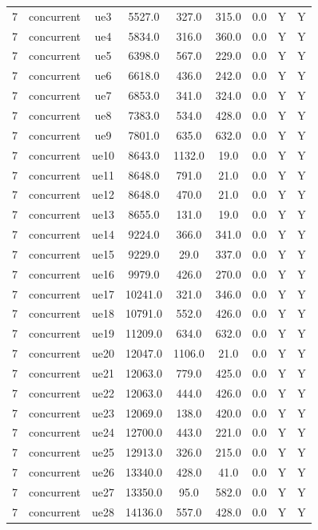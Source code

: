 \begin{table}[ht]
\begin{tabular}{|c|c|c|c|c|c|c|c|c|}
7 & concurrent & ue3 & 5527.0 & 327.0 & 315.0 & 0.0 & Y & Y \\
7 & concurrent & ue4 & 5834.0 & 316.0 & 360.0 & 0.0 & Y & Y \\
7 & concurrent & ue5 & 6398.0 & 567.0 & 229.0 & 0.0 & Y & Y \\
7 & concurrent & ue6 & 6618.0 & 436.0 & 242.0 & 0.0 & Y & Y \\
7 & concurrent & ue7 & 6853.0 & 341.0 & 324.0 & 0.0 & Y & Y \\
7 & concurrent & ue8 & 7383.0 & 534.0 & 428.0 & 0.0 & Y & Y \\
7 & concurrent & ue9 & 7801.0 & 635.0 & 632.0 & 0.0 & Y & Y \\
7 & concurrent & ue10 & 8643.0 & 1132.0 & 19.0 & 0.0 & Y & Y \\
7 & concurrent & ue11 & 8648.0 & 791.0 & 21.0 & 0.0 & Y & Y \\
7 & concurrent & ue12 & 8648.0 & 470.0 & 21.0 & 0.0 & Y & Y \\
7 & concurrent & ue13 & 8655.0 & 131.0 & 19.0 & 0.0 & Y & Y \\
7 & concurrent & ue14 & 9224.0 & 366.0 & 341.0 & 0.0 & Y & Y \\
7 & concurrent & ue15 & 9229.0 & 29.0 & 337.0 & 0.0 & Y & Y \\
7 & concurrent & ue16 & 9979.0 & 426.0 & 270.0 & 0.0 & Y & Y \\
7 & concurrent & ue17 & 10241.0 & 321.0 & 346.0 & 0.0 & Y & Y \\
7 & concurrent & ue18 & 10791.0 & 552.0 & 426.0 & 0.0 & Y & Y \\
7 & concurrent & ue19 & 11209.0 & 634.0 & 632.0 & 0.0 & Y & Y \\
7 & concurrent & ue20 & 12047.0 & 1106.0 & 21.0 & 0.0 & Y & Y \\
7 & concurrent & ue21 & 12063.0 & 779.0 & 425.0 & 0.0 & Y & Y \\
7 & concurrent & ue22 & 12063.0 & 444.0 & 426.0 & 0.0 & Y & Y \\
7 & concurrent & ue23 & 12069.0 & 138.0 & 420.0 & 0.0 & Y & Y \\
7 & concurrent & ue24 & 12700.0 & 443.0 & 221.0 & 0.0 & Y & Y \\
7 & concurrent & ue25 & 12913.0 & 326.0 & 215.0 & 0.0 & Y & Y \\
7 & concurrent & ue26 & 13340.0 & 428.0 & 41.0 & 0.0 & Y & Y \\
7 & concurrent & ue27 & 13350.0 & 95.0 & 582.0 & 0.0 & Y & Y \\
7 & concurrent & ue28 & 14136.0 & 557.0 & 428.0 & 0.0 & Y & Y \\

\end{tabular}
\end{table}
